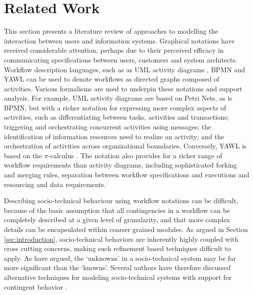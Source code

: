 \documentclass{llncs}
\newcommand{\picalc}{\(\pi\)-calculus }
\begin{document}

\section{Related Work}
\label{sec:related}


This section presents a literature review of approaches to modelling the interaction between users and information
systems.  Graphical notations have received considerable attention, perhaps due to their perceived efficacy in
communicating specifications between users, customers and system architects.  Workflow description languages, such as as
UML activity diagrams \citep{omg07omguml}, BPMN \citep{omg2011omgbpmn} and YAWL \citep{hofstede2010yawl} can be used to
denote workflows as directed graphs composed of activities.  Various formalisms are used to underpin these notations and
support analysis.  For example, UML activity diagrams are based on Petri Nets, as is BPMN, but with a richer notation
for expressing more complex aspects of activities, such as differentiating between tasks, activities and transactions;
triggering and orchestrating concurrent activities using messages; the identification of information resources need to
realize an activity; and the orchestration of activities across organizational boundaries.  Conversely, YAWL is based on
the \picalc \citep{aalst2004workflow}.  The notation also provides for a richer range of workflow requirements than
activity diagrams, including sophisticated forking and merging rules, separation between workflow specifications and
executions and resourcing and data requirements.

Describing socio-technical behaviour using workflow notations can be difficult, because of the basic assumption that all
contingencies in a workflow can be completely described at a given level of granularity, and that more complex details
can be encapsulated within coarser grained modules.  As argued in Section \ref{sec:introduction}, socio-technical
behaviors are inherently highly coupled with cross cutting concerns, making such refinement based techniques difficult
to apply.  As \citet{israilidis13ignorance} have argued, the `unknowns' in a socio-technical system may be far more
significant than the `knowns'. Several authors have therefore discussed alternative techniques for modeling
socio-technical systems with support for contingent behavior
\citep{dardenne93goal,sommerville09deriving,voinov13integronsters,yu1995social}.
\end{document}
